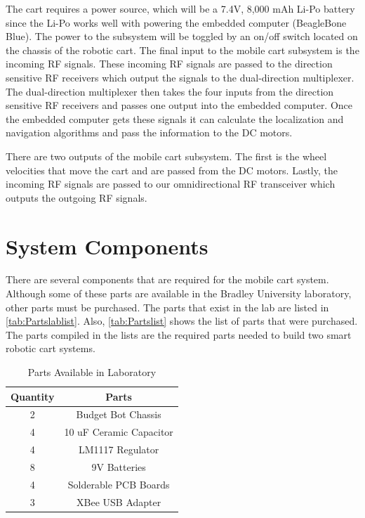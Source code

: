 The cart requires a power source, which will be a 7.4V, 8,000 mAh Li-Po battery since the
Li-Po works well with powering the embedded computer (BeagleBone Blue). The
power to the subsystem will be toggled by an on/off switch located on the
chassis of the robotic cart. The final input to the mobile cart subsystem is the
incoming RF signals. These incoming RF signals are passed to the direction
sensitive RF receivers which output the signals to the dual-direction
multiplexer. The dual-direction multiplexer then takes the four inputs from the
direction sensitive RF receivers and passes one output into the embedded
computer. Once the embedded computer gets these signals it can calculate the
localization and navigation algorithms and pass the information to the DC
motors.

\vspace*{12pt}
\noindent
There are two outputs of the mobile cart subsystem. The first is the wheel velocities that move the cart and are passed from the DC motors. Lastly, the incoming RF signals are passed to our omnidirectional RF transceiver which outputs the outgoing RF signals.


\section{System Components}

There are several components that are required for the mobile cart system.
Although some of these parts are available in the Bradley University laboratory,
other parts must be purchased. The parts that exist in the lab are listed in
\autoref{tab:Partslablist}. Also, \autoref{tab:Partslist} shows the list of
parts that were purchased. The parts compiled in the lists are the required
parts needed to build two smart robotic cart systems.

\begin{table}[h!]
  \centering
  \caption{Parts Available in Laboratory}
  \begin{tabular}{c|c}
      \toprule
      \textbf{Quantity} & \textbf{Parts}\\
      \toprule
      2 & Budget Bot Chassis\\
      4 & 10 uF Ceramic Capacitor\\
      4 & LM1117 Regulator\\
      8 & 9V Batteries\\
      4 & Solderable PCB Boards\\
      3 & XBee USB Adapter\\
      \bottomrule
  \end{tabular}
  \label{tab:Partslablist}
\end{table}

